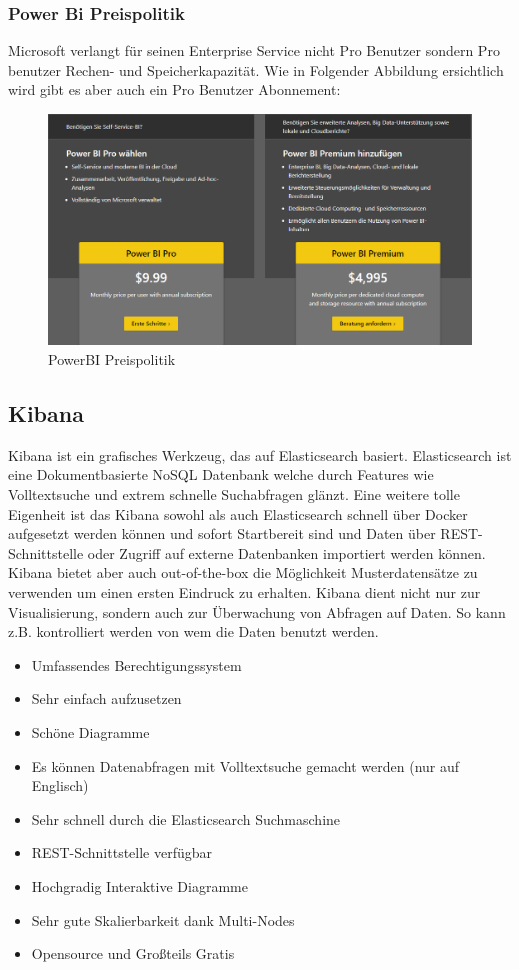 \subsubsection{Power Bi Preispolitik}
Microsoft verlangt für seinen Enterprise Service nicht Pro Benutzer sondern Pro benutzer Rechen- und Speicherkapazität. Wie in Folgender Abbildung ersichtlich wird gibt es aber auch ein Pro Benutzer Abonnement:
\begin{figure}[h]
    \includegraphics[scale=.60]{images/PowerBi_Preise.png}
    \caption{PowerBI Preispolitik}
    \label{img:powerbi_preise}
\end{figure}

\subsection{Kibana}
Kibana ist ein grafisches Werkzeug, das auf Elasticsearch basiert. Elasticsearch ist eine Dokumentbasierte NoSQL Datenbank welche durch Features wie Volltextsuche und extrem schnelle Suchabfragen glänzt. Eine weitere tolle Eigenheit ist das Kibana sowohl als auch Elasticsearch schnell über Docker aufgesetzt werden können und sofort Startbereit sind und Daten über REST-Schnittstelle oder Zugriff auf externe Datenbanken importiert werden können. Kibana bietet aber auch out-of-the-box die Möglichkeit Musterdatensätze zu verwenden um einen ersten Eindruck zu erhalten. Kibana dient nicht nur zur Visualisierung, sondern auch zur Überwachung von Abfragen auf Daten. So kann z.B. kontrolliert werden von wem die Daten benutzt werden.
\begin{itemize}
\item Umfassendes Berechtigungssystem
\item Sehr einfach aufzusetzen
\item Schöne Diagramme
\item Es können Datenabfragen mit Volltextsuche gemacht werden (nur auf Englisch)
\item Sehr schnell durch die Elasticsearch Suchmaschine
\item REST-Schnittstelle verfügbar
\item Hochgradig Interaktive Diagramme
\item Sehr gute Skalierbarkeit dank Multi-Nodes
\item Opensource und Großteils Gratis
\end{itemize}
